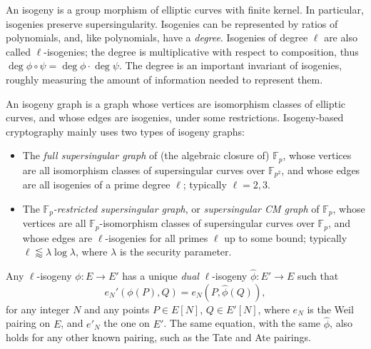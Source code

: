 \documentclass{llncs}
\newcommand{\F}{\mathbb{F}}
\begin{document}
An isogeny is a group morphism of elliptic curves with finite
kernel. %
In particular, isogenies preserve supersingularity. %
Isogenies can be represented by ratios of polynomials, and, like
polynomials, have a \emph{degree}. %
Isogenies of degree $\ell$ are also called $\ell$-isogenies; the
degree is multiplicative with respect to composition, thus
$\deg\phi\circ\psi=\deg\phi\cdot\deg\psi$. %
The degree is an important invariant of isogenies, roughly measuring
the amount of information needed to represent them.

An isogeny graph is a graph whose vertices are isomorphism classes of
elliptic curves, and whose edges are isogenies, under some
restrictions. %
Isogeny-based cryptography mainly uses two types of isogeny graphs:
\begin{itemize}
\item The \emph{full supersingular graph} of (the algebraic closure of)
  $\F_p$, whose vertices
  are all isomorphism classes of supersingular curves over $\F_{p^2}$,
  and whose edges are all isogenies of a prime degree $\ell$;
  typically $\ell=2,3$.
\item The \emph{$\F_p$-restricted supersingular graph}, or
  \emph{supersingular CM graph} of $\F_p$, whose vertices are all
  $\F_p$-isomorphism classes of supersingular curves over $\F_p$, and
  whose edges are $\ell$-isogenies for all primes $\ell$ up to some
  bound; typically $\ell\lessapprox\lambda\log\lambda$, where
  $\lambda$ is the security parameter.
\end{itemize}

Any $\ell$-isogeny $\phi:E\to E'$ has a unique \emph{dual}
$\ell$-isogeny $\hat\phi:E'\to E$ such that
\begin{equation}
  \label{eq:adjoin}
  e_N'(\phi(P),Q) = e_N(P,\hat\phi(Q)),
\end{equation}
for any integer $N$ and any points $P\in E[N]$, $Q\in E'[N]$, where
$e_N$ is the Weil pairing on $E$, and $e'_N$ the one on $E'$. %
The same equation, with the same $\hat\phi$, also holds for any other
known pairing, such as the Tate and Ate pairings.
\end{document}
